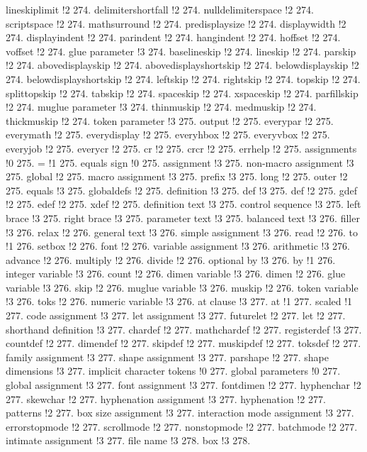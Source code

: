 lineskiplimit !2 274.
delimitershortfall !2 274.
nulldelimiterspace !2 274.
scriptspace !2 274.
mathsurround !2 274.
predisplaysize !2 274.
displaywidth !2 274.
displayindent !2 274.
parindent !2 274.
hangindent !2 274.
hoffset !2 274.
voffset !2 274.
glue parameter !3 274.
baselineskip !2 274.
lineskip !2 274.
parskip !2 274.
abovedisplayskip !2 274.
abovedisplayshortskip !2 274.
belowdisplayskip !2 274.
belowdisplayshortskip !2 274.
leftskip !2 274.
rightskip !2 274.
topskip !2 274.
splittopskip !2 274.
tabskip !2 274.
spaceskip !2 274.
xspaceskip !2 274.
parfillskip !2 274.
muglue parameter !3 274.
thinmuskip !2 274.
medmuskip !2 274.
thickmuskip !2 274.
token parameter !3 275.
output !2 275.
everypar !2 275.
everymath !2 275.
everydisplay !2 275.
everyhbox !2 275.
everyvbox !2 275.
everyjob !2 275.
everycr !2 275.
cr !2 275.
crcr !2 275.
errhelp !2 275.
assignments !0 275.
= !1 275.
equals sign !0 275.
assignment !3 275.
non-macro assignment !3 275.
global !2 275.
macro assignment !3 275.
prefix !3 275.
long !2 275.
outer !2 275.
equals !3 275.
globaldefs !2 275.
definition !3 275.
def !3 275.
def !2 275.
gdef !2 275.
edef !2 275.
xdef !2 275.
definition text !3 275.
control sequence !3 275.
left brace !3 275.
right brace !3 275.
parameter text !3 275.
balanced text !3 276.
filler !3 276.
relax !2 276.
general text !3 276.
simple assignment !3 276.
read !2 276.
to !1 276.
setbox !2 276.
font !2 276.
variable assignment !3 276.
arithmetic !3 276.
advance !2 276.
multiply !2 276.
divide !2 276.
optional {\fam \ttfam \ninett by} !3 276.
by !1 276.
integer variable !3 276.
count !2 276.
dimen variable !3 276.
dimen !2 276.
glue variable !3 276.
skip !2 276.
muglue variable !3 276.
muskip !2 276.
token variable !3 276.
toks !2 276.
numeric variable !3 276.
at clause !3 277.
at !1 277.
scaled !1 277.
code assignment !3 277.
let assignment !3 277.
futurelet !2 277.
let !2 277.
shorthand definition !3 277.
chardef !2 277.
mathchardef !2 277.
registerdef !3 277.
countdef !2 277.
dimendef !2 277.
skipdef !2 277.
muskipdef !2 277.
toksdef !2 277.
family assignment !3 277.
shape assignment !3 277.
parshape !2 277.
shape dimensions !3 277.
implicit character tokens !0 277.
global parameters !0 277.
global assignment !3 277.
font assignment !3 277.
fontdimen !2 277.
hyphenchar !2 277.
skewchar !2 277.
hyphenation assignment !3 277.
hyphenation !2 277.
patterns !2 277.
box size assignment !3 277.
interaction mode assignment !3 277.
errorstopmode !2 277.
scrollmode !2 277.
nonstopmode !2 277.
batchmode !2 277.
intimate assignment !3 277.
file name !3 278.
box !3 278.
